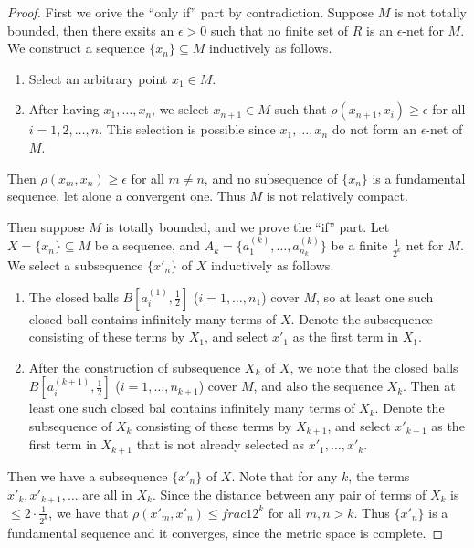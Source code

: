 \documentclass[a4paper,12pt]{article}
\theoremstyle{definition}
\theoremstyle{remark}
\begin{document}
\begin{proof}
  First we orive the ``only if'' part by contradiction. Suppose $M$ is not totally bounded, then there exsits an $\epsilon > 0$ such that no finite set of $R$ is an $\epsilon$-net for $M$. We construct a sequence $\{ x_n \} \subseteq M$ inductively as follows.
  \begin{enumerate}
  \item
    Select an arbitrary point $x_1 \in M$.
  \item
    After having $x_1, \dotsc, x_n$, we select $x_{n + 1} \in M$ such that $\rho(x_{n + 1}, x_i) \geq \epsilon$ for all $i = 1, 2, \dotsc, n$. This selection is possible since $x_1, \dotsc, x_n$ do not form an $\epsilon$-net of $M$.
  \end{enumerate}
  Then $\rho(x_m, x_n) \geq \epsilon$ for all $m \neq n$, and no subsequence of $\{ x_n \}$ is a fundamental sequence, let alone a convergent one. Thus $M$ is not relatively compact.

  Then suppose $M$ is totally bounded, and we prove the ``if'' part. Let $X = \{ x_n \} \subseteq M$ be a sequence, and $A_k = \{ a^{(k)}_1, \dotsc, a^{(k)}_{n_k} \}$ be a finite $\frac{1}{2^k}$ net for $M$. We select a subsequence $\{ x'_n \}$ of $X$ inductively as follows.
  \begin{enumerate}
  \item
    The closed balls $B[a^{(1)}_i, \frac{1}{2}]$ ($i = 1, \dotsc, n_1$) cover $M$, so at least one such closed ball contains infinitely many terms of $X$. Denote the subsequence consisting of these terms by $X_1$, and select $x'_1$ as the first term in $X_1$.
  \item
    After the construction of subsequence $X_k$ of $X$, we note that the closed balls $B[a^{(k + 1)}_i, \frac{1}{2}]$ ($i = 1, \dotsc, n_{k + 1}$) cover $M$, and also the sequence $X_k$. Then at least one such closed bal contains infinitely many terms of $X_k$. Denote the subsequence of $X_k$ consisting of these terms by $X_{k + 1}$, and select $x'_{k + 1}$ as the first term in $X_{k + 1}$ that is not already selected as $x'_1, \dotsc, x'_k$. 
  \end{enumerate}
  Then we have a subsequence $\{ x'_n \}$ of $X$. Note that for any $k$, the terms $x'_k, x'_{k + 1}, \dotsc$ are all in $X_k$. Since the distance between any pair of terms of $X_k$ is $\leq 2 \cdot \frac{1}{2^k}$, we have that $\rho(x'_m, x'_n) \leq frac{1}{2^k}$ for all $m, n > k$. Thus $\{ x'_n \}$ is a fundamental sequence and it converges, since the metric space is complete.
\end{proof}
\end{document}
